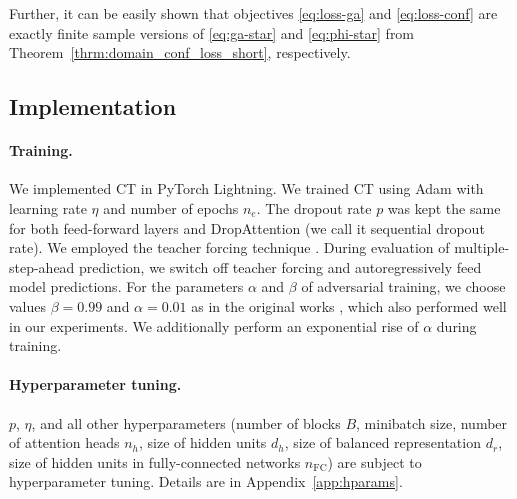 \documentclass{article}
\theoremstyle{plain}
\theoremstyle{definition}
\theoremstyle{remark}
\newcommand{\shortname}{CT\xspace}
\begin{document}
Further, it can be easily shown that objectives \eqref{eq:loss-ga} and \eqref{eq:loss-conf} are exactly finite sample versions of \eqref{eq:ga-star} and \eqref{eq:phi-star} from Theorem~\ref{thrm:domain_conf_loss_short}, respectively.


\subsection{Implementation}

\paragraph{Training.} We implemented \shortname in PyTorch Lightning. We trained \shortname using Adam \cite{kingma2014adam} with learning rate $\eta$ and number of epochs $n_e$. The dropout rate $p$ was kept the same for both feed-forward layers and DropAttention (we call it sequential dropout rate). We employed the teacher forcing technique \cite{williams1989learning}. During evaluation of multiple-step-ahead prediction, we switch off teacher forcing and autoregressively feed model predictions. For the parameters $\alpha$ and $\beta$ of adversarial training, we choose values $\beta = 0.99$ and $\alpha = 0.01$ as in the original works \cite{tzeng2015simultaneous,yaz2018unusual}, which also performed well in our experiments. We additionally perform an exponential rise of $\alpha$ during training. 

\paragraph{Hyperparameter tuning.}  $p$, $\eta$, and all other hyperparameters (number of blocks $B$, minibatch size, number of attention heads $n_h$, size of hidden units $d_h$, size of balanced representation $d_r$, size of hidden units in fully-connected networks $n_{\text{FC}}$) are subject to hyperparameter tuning. Details are in Appendix~\ref{app:hparams}. 


\begin{table}[tbp]
    \vskip -0.075in
    \caption{Results for experiments with real-world medical data (MIMIC-III). Shown: RMSE as mean $\pm$ standard deviation over five runs.}
    \label{tab:mimic-real-sim-all}
    \begin{center}
        \tiny
        
    \end{center}
    \vskip -0.29in
\end{table}
\end{document}

